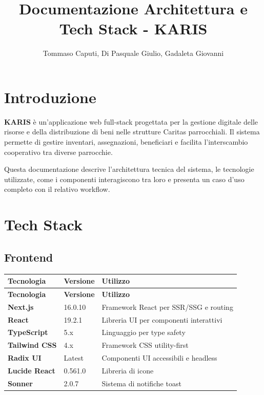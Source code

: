 \documentclass{article}
\title{Documentazione Architettura e Tech Stack - KARIS}
\author{Tommaso Caputi, Di Pasquale Giulio, Gadaleta Giovanni}
\begin{document}
\maketitle
\newpage

\tableofcontents
\newpage

\section{Introduzione}

\textbf{KARIS} è un'applicazione web full-stack progettata per la gestione digitale delle risorse e della distribuzione di beni nelle strutture Caritas parrocchiali. Il sistema permette di gestire inventari, assegnazioni, beneficiari e facilita l'interscambio cooperativo tra diverse parrocchie.

Questa documentazione descrive l'architettura tecnica del sistema, le tecnologie utilizzate, come i componenti interagiscono tra loro e presenta un caso d'uso completo con il relativo workflow.

\section{Tech Stack}

\subsection{Frontend}

\begin{longtable}{p{4cm}p{3cm}p{8cm}}
\toprule
\textbf{Tecnologia} & \textbf{Versione} & \textbf{Utilizzo} \\
\midrule
\endfirsthead
\toprule
\textbf{Tecnologia} & \textbf{Versione} & \textbf{Utilizzo} \\
\midrule
\endhead
\bottomrule
\endfoot
\bottomrule
\endlastfoot
\textbf{Next.js} & 16.0.10 & Framework React per SSR/SSG e routing \\
\textbf{React} & 19.2.1 & Libreria UI per componenti interattivi \\
\textbf{TypeScript} & 5.x & Linguaggio per type safety \\
\textbf{Tailwind CSS} & 4.x & Framework CSS utility-first \\
\textbf{Radix UI} & Latest & Componenti UI accessibili e headless \\
\textbf{Lucide React} & 0.561.0 & Libreria di icone \\
\textbf{Sonner} & 2.0.7 & Sistema di notifiche toast \\
\end{longtable}
\end{document}
